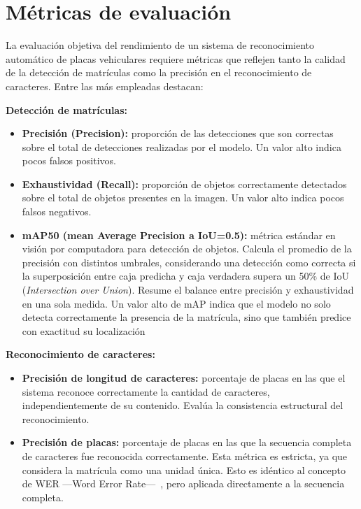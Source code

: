 \section{Métricas de evaluación}

La evaluación objetiva del rendimiento de un sistema de reconocimiento automático de placas
vehiculares requiere métricas que reflejen tanto la calidad de la detección de matrículas 
como la precisión en el reconocimiento de caracteres. Entre las más empleadas destacan:

\textbf{Detección de matrículas:}

\begin{itemize}
	\item \textbf{Precisión (Precision):} proporción de las detecciones que son 
		correctas sobre el total de detecciones realizadas por el modelo.
		Un valor alto indica pocos falsos positivos.
	\item \textbf{Exhaustividad (Recall):} proporción de objetos correctamente detectados 
		sobre el total de objetos presentes en la imagen.
		Un valor alto indica pocos falsos negativos.
	\item \textbf{mAP50 (mean Average Precision a IoU=0.5):} métrica estándar en visión por computadora 
		para detección de objetos. Calcula el promedio de la precisión con distintos umbrales,
		considerando una detección como correcta si la superposición entre caja predicha
		y caja verdadera supera un 50\% de IoU (\textit{Intersection over Union}). 
		Resume el balance entre precisión y exhaustividad en una sola medida.
		Un valor alto de mAP indica que el modelo no solo detecta correctamente
		la presencia de la matrícula, sino que también predice con exactitud su localización
\end{itemize}

\textbf{Reconocimiento de caracteres:}

\begin{itemize}
	\item \textbf{Precisión de longitud de caracteres:} porcentaje de placas en las 
		que el sistema reconoce correctamente la cantidad de caracteres,
		independientemente de su contenido. Evalúa la consistencia estructural del reconocimiento.

	\item \textbf{Precisión de placas:} porcentaje de placas en las que la secuencia completa de caracteres
		fue reconocida correctamente. Esta métrica es estricta,
		ya que considera la matrícula como una unidad única. 
		Esto es idéntico al concepto de WER ---Word Error Rate---~\cite{vargoorani2024license},
		pero aplicada directamente a la secuencia completa.
\end{itemize}

